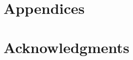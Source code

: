 \documentclass{ws-ijfe}
\begin{document}

\appendix

\section{Appendices}
\label{sec:AppendixA}


\section*{Acknowledgments}

%
%
%
%


\end{document}
